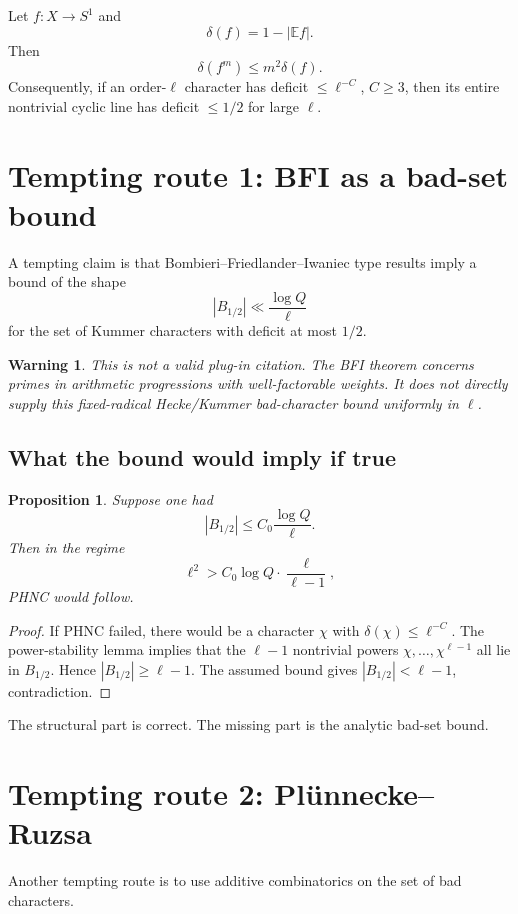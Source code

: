 \documentclass[11pt]{article}
\newtheorem{proposition}{Proposition}
\newtheorem{warning}{Warning}
\newcommand{\E}{\mathbb E}
\newcommand{\1}{\mathbf 1}
\begin{document}
Let \(f:X\to S^1\) and
\[
\delta(f)=1-|\E f|.
\]
Then
\[
\delta(f^m)\le m^2\delta(f).
\]
Consequently, if an order-\(\ell\) character has deficit \(\le\ell^{-C}\), \(C\ge3\), then its entire nontrivial cyclic line has deficit \(\le1/2\) for large \(\ell\).

\section{Tempting route 1: BFI as a bad-set bound}

A tempting claim is that Bombieri--Friedlander--Iwaniec type results imply a bound of the shape
\[
|B_{1/2}|\ll \frac{\log Q}{\ell}
\]
for the set of Kummer characters with deficit at most \(1/2\).

\begin{warning}
This is not a valid plug-in citation.  The BFI theorem concerns primes in arithmetic progressions with well-factorable weights.  It does not directly supply this fixed-radical Hecke/Kummer bad-character bound uniformly in \(\ell\).
\end{warning}

\subsection{What the bound would imply if true}

\begin{proposition}
Suppose one had
\[
|B_{1/2}|\le C_0\frac{\log Q}{\ell}.
\]
Then in the regime
\[
\ell^2>C_0\log Q\cdot\frac{\ell}{\ell-1},
\]
PHNC would follow.
\end{proposition}

\begin{proof}
If PHNC failed, there would be a character \(\chi\) with \(\delta(\chi)\le\ell^{-C}\).  The power-stability lemma implies that the \(\ell-1\) nontrivial powers \(\chi,\dots,\chi^{\ell-1}\) all lie in \(B_{1/2}\).  Hence \(|B_{1/2}|\ge\ell-1\).  The assumed bound gives \(|B_{1/2}|<\ell-1\), contradiction.
\end{proof}

The structural part is correct.  The missing part is the analytic bad-set bound.

\section{Tempting route 2: Pl\"unnecke--Ruzsa}

Another tempting route is to use additive combinatorics on the set of bad characters.
\end{document}

